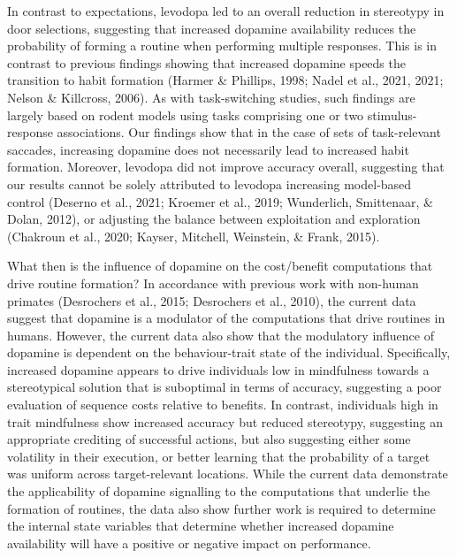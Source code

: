 \documentclass[
  man]{apa6}
\begin{document}
In contrast to expectations, levodopa led to an overall reduction in stereotypy in door selections, suggesting that increased dopamine availability reduces the probability of forming a routine when performing multiple responses. This is in contrast to previous findings showing that increased dopamine speeds the transition to habit formation (Harmer \& Phillips, 1998; Nadel et al., 2021, 2021; Nelson \& Killcross, 2006). As with task-switching studies, such findings are largely based on rodent models using tasks comprising one or two stimulus-response associations. Our findings show that in the case of sets of task-relevant saccades, increasing dopamine does not necessarily lead to increased habit formation. Moreover, levodopa did not improve accuracy overall, suggesting that our results cannot be solely attributed to levodopa increasing model-based control (Deserno et al., 2021; Kroemer et al., 2019; Wunderlich, Smittenaar, \& Dolan, 2012), or adjusting the balance between exploitation and exploration (Chakroun et al., 2020; Kayser, Mitchell, Weinstein, \& Frank, 2015).

What then is the influence of dopamine on the cost/benefit computations that drive routine formation? In accordance with previous work with non-human primates (Desrochers et al., 2015; Desrochers et al., 2010), the current data suggest that dopamine is a modulator of the computations that drive routines in humans. However, the current data also show that the modulatory influence of dopamine is dependent on the behaviour-trait state of the individual. Specifically, increased dopamine appears to drive individuals low in mindfulness towards a stereotypical solution that is suboptimal in terms of accuracy, suggesting a poor evaluation of sequence costs relative to benefits. In contrast, individuals high in trait mindfulness show increased accuracy but reduced stereotypy, suggesting an appropriate crediting of successful actions, but also suggesting either some volatility in their execution, or better learning that the probability of a target was uniform across target-relevant locations. While the current data demonstrate the applicability of dopamine signalling to the computations that underlie the formation of routines, the data also show further work is required to determine the internal state variables that determine whether increased dopamine availability will have a positive or negative impact on performance.
\end{document}
